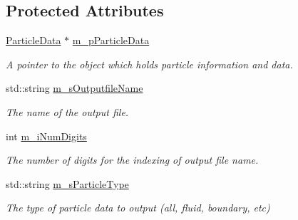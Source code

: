 \subsection*{Protected Attributes}
\begin{DoxyCompactItemize}
\item 
\hypertarget{classParticleViewer_a9e81687c52b104ed42c9daeb8ba1169c}{\hyperlink{classParticleData}{Particle\-Data} $\ast$ \hyperlink{classParticleViewer_a9e81687c52b104ed42c9daeb8ba1169c}{m\-\_\-p\-Particle\-Data}}\label{classParticleViewer_a9e81687c52b104ed42c9daeb8ba1169c}

\begin{DoxyCompactList}\small\item\em A pointer to the object which holds particle information and data. \end{DoxyCompactList}\item 
\hypertarget{classParticleViewer_aa1aac6307294cfedf9fd1ceedc56709a}{std\-::string \hyperlink{classParticleViewer_aa1aac6307294cfedf9fd1ceedc56709a}{m\-\_\-s\-Outputfile\-Name}}\label{classParticleViewer_aa1aac6307294cfedf9fd1ceedc56709a}

\begin{DoxyCompactList}\small\item\em The name of the output file. \end{DoxyCompactList}\item 
\hypertarget{classParticleViewer_a537f17422635f011d54cc577a4710c88}{int \hyperlink{classParticleViewer_a537f17422635f011d54cc577a4710c88}{m\-\_\-i\-Num\-Digits}}\label{classParticleViewer_a537f17422635f011d54cc577a4710c88}

\begin{DoxyCompactList}\small\item\em The number of digits for the indexing of output file name. \end{DoxyCompactList}\item 
\hypertarget{classParticleViewer_aca59927807bc54a5b7c5ea227c8fe82f}{std\-::string \hyperlink{classParticleViewer_aca59927807bc54a5b7c5ea227c8fe82f}{m\-\_\-s\-Particle\-Type}}\label{classParticleViewer_aca59927807bc54a5b7c5ea227c8fe82f}

\begin{DoxyCompactList}\small\item\em The type of particle data to output (all, fluid, boundary, etc) \end{DoxyCompactList}\end{DoxyCompactItemize}


